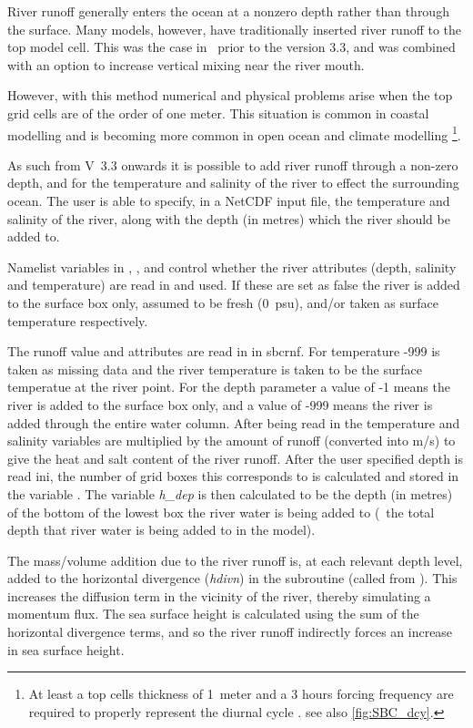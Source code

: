 \documentclass[../main/NEMO_manual]{subfiles}
\begin{document}
River runoff generally enters the ocean at a nonzero depth rather than through the surface.
Many models, however, have traditionally inserted river runoff to the top model cell.
This was the case in \NEMO\ prior to the version 3.3,
and was combined with an option to increase vertical mixing near the river mouth.

However, with this method numerical and physical problems arise when the top grid cells are of the order of one meter.
This situation is common in coastal modelling and is becoming more common in open ocean and climate modelling
\footnote{
  At least a top cells thickness of 1~meter and a 3 hours forcing frequency are required to
  properly represent the diurnal cycle \citep{bernie.woolnough.ea_JC05}.
  see also \autoref{fig:SBC_dcy}.}.

As such from V~3.3 onwards it is possible to add river runoff through a non-zero depth,
and for the temperature and salinity of the river to effect the surrounding ocean.
The user is able to specify, in a NetCDF input file, the temperature and salinity of the river,
along with the depth (in metres) which the river should be added to.

Namelist variables in , ,  and
 control whether the river attributes (depth, salinity and temperature) are read in and used.
If these are set as false the river is added to the surface box only, assumed to be fresh (0~psu),
and/or taken as surface temperature respectively.

The runoff value and attributes are read in in sbcrnf.
For temperature -999 is taken as missing data and the river temperature is taken to
be the surface temperatue at the river point.
For the depth parameter a value of -1 means the river is added to the surface box only,
and a value of -999 means the river is added through the entire water column.
After being read in the temperature and salinity variables are multiplied by the amount of runoff
(converted into m/s) to give the heat and salt content of the river runoff.
After the user specified depth is read ini,
the number of grid boxes this corresponds to is calculated and stored in the variable .
The variable \textit{h\_dep} is then calculated to be the depth (in metres) of
the bottom of the lowest box the river water is being added to
(\ie\ the total depth that river water is being added to in the model).

The mass/volume addition due to the river runoff is, at each relevant depth level, added to
the horizontal divergence (\textit{hdivn}) in the subroutine  (called from ).
This increases the diffusion term in the vicinity of the river, thereby simulating a momentum flux.
The sea surface height is calculated using the sum of the horizontal divergence terms,
and so the river runoff indirectly forces an increase in sea surface height.
\end{document}
